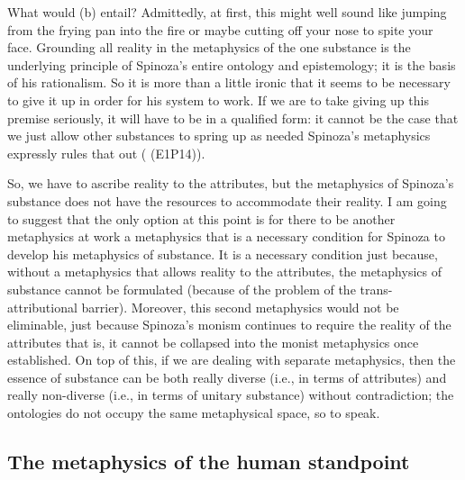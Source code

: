 \documentclass[11pt]{article}
\newcommand{\dash}{\unskip{---}}
\newcommand\texttitle[1]{\emph{#1}}
\begin{document}
	What would (b) entail? Admittedly, at first, this might well sound like jumping from the frying pan into the fire \dash or maybe cutting off your nose to spite your face. Grounding all reality in the metaphysics of the one substance is the underlying principle of Spinoza’s entire ontology and epistemology; it is the basis of his rationalism. So it is more than a little ironic that it seems to be necessary to give it up in order for his system to work. If we are to take giving up this premise seriously, it will have to be in a qualified form: it cannot be the case that we just allow other substances to spring up as needed \dash Spinoza’s metaphysics expressly rules that out ( (E1P14)).
	
	So, we have to ascribe reality to the attributes, but the metaphysics of Spinoza’s substance does not have the resources to accommodate their reality. I am going to suggest that the only option at this point is for there to be another metaphysics at work \dash a metaphysics that is a necessary condition for Spinoza to develop his metaphysics of substance. It is a necessary condition just because, without a metaphysics that allows reality to the attributes, the metaphysics of substance cannot be formulated (because of the problem of the trans-attributional barrier). Moreover, this second metaphysics would not be eliminable, just because Spinoza’s monism continues to require the reality of the attributes \dash that is, it cannot be collapsed into the monist metaphysics once established. On top of this, if we are dealing with separate metaphysics, then the essence of substance can be both really diverse (i.e., in terms of attributes) and really non-diverse (i.e., in terms of unitary substance) without contradiction; the ontologies do not occupy the same metaphysical space, so to speak.
	
	\subsection{The metaphysics of the human standpoint} \label{subsec:MHS}
	
	
\end{document}
